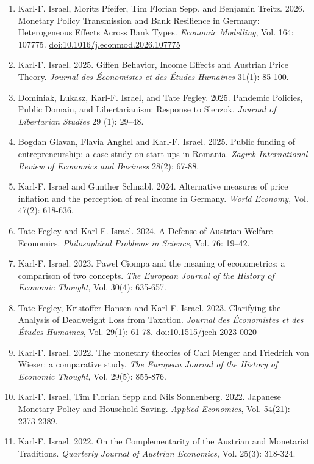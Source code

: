 \documentclass[11pt]{article}
\begin{document}
\begin{enumerate}
    \item Karl-F. Israel, Moritz Pfeifer, Tim Florian Sepp, and Benjamin Treitz. 2026. Monetary Policy Transmission and Bank Resilience in Germany: Heterogeneous Effects Across Bank Types. \textit{Economic Modelling}, Vol. 164: 107775. \href{https://doi.org/10.1016/j.econmod.2026.107775}{doi:10.1016/j.econmod.2026.107775} 
    \item Karl-F. Israel. 2025. Giffen Behavior, Income Effects and Austrian Price Theory. \textit{Journal des Économistes et des Études Humaines} 31(1): 85-100. 
    \item Dominiak, Lukasz, Karl-F. Israel, and Tate Fegley. 2025. Pandemic Policies, Public Domain, and Libertarianism: Response to Slenzok. \textit{Journal of Libertarian Studies} 29 (1): 29–48.
    \item Bogdan Glavan, Flavia Anghel and Karl-F. Israel. 2025. Public funding of entrepreneurship: a case study on start-ups in Romania. \textit{Zagreb International Review of Economics and Business} 28(2): 67-88.
    \item Karl-F. Israel and Gunther Schnabl. 2024. Alternative measures of price inflation and the perception of real income in Germany. \textit{World Economy}, Vol. 47(2): 618-636.
    \item Tate Fegley and Karl-F. Israel. 2024. A Defense of Austrian Welfare Economics. \textit{Philosophical Problems in Science}, Vol. 76: 19–42.
    \item Karl-F. Israel. 2023. Pawel Ciompa and the meaning of econometrics: a comparison of two concepts. \textit{The European Journal of the History of Economic Thought}, Vol. 30(4): 635-657.
    \item Tate Fegley, Kristoffer Hansen and Karl-F. Israel. 2023. Clarifying the Analysis of Deadweight Loss from Taxation. \textit{Journal des Économistes et des Études Humaines}, Vol. 29(1): 61-78. \href{https://doi.org/10.1515/jeeh-2023-0020}{doi:10.1515/jeeh-2023-0020}
    \item Karl-F. Israel. 2022. The monetary theories of Carl Menger and Friedrich von Wieser: a comparative study. \textit{The European Journal of the History of Economic Thought}, Vol. 29(5): 855-876.
    \item Karl-F. Israel, Tim Florian Sepp and Nils Sonnenberg. 2022. Japanese Monetary Policy and Household Saving. \textit{Applied Economics}, Vol. 54(21): 2373-2389.
    \item Karl-F. Israel. 2022. On the Complementarity of the Austrian and Monetarist Traditions. \textit{Quarterly Journal of Austrian Economics}, Vol. 25(3): 318-324.

\end{enumerate}
\end{document}
